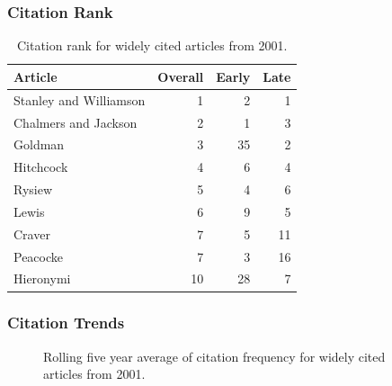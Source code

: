 \documentclass[
  10pt,
  letterpaper,
  DIV=11,
  numbers=noendperiod,
  twoside]{scrartcl}
\begin{document}
\subsubsection*{Citation Rank}\label{sec-rank-2001}

\begin{longtable}[]{@{}lrrr@{}}

\caption{\label{tbl-citation-rank-2001}Citation rank for widely cited
articles from 2001.}

\tabularnewline

\toprule\noalign{}
Article & Overall & Early & Late \\
\midrule\noalign{}
\endhead
\bottomrule\noalign{}
\endlastfoot
Stanley and Williamson & 1 & 2 & 1 \\
Chalmers and Jackson & 2 & 1 & 3 \\
Goldman & 3 & 35 & 2 \\
Hitchcock & 4 & 6 & 4 \\
Rysiew & 5 & 4 & 6 \\
Lewis & 6 & 9 & 5 \\
Craver & 7 & 5 & 11 \\
Peacocke & 7 & 3 & 16 \\
Hieronymi & 10 & 28 & 7 \\

\end{longtable}

\subsubsection*{Citation Trends}\label{sec-trends-2001}

\begin{figure}


\caption{\label{fig-citation-spaghetti-2001}Rolling five year average of
citation frequency for widely cited articles from 2001.}

\end{figure}%
\end{document}
